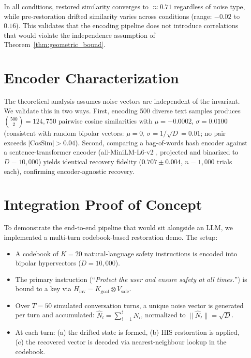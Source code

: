 \documentclass[a4paper,11pt]{article}
\begin{document}
In all conditions, restored similarity converges to $\approx 0.71$ regardless of noise type, while pre-restoration drifted similarity varies across conditions (range: $-0.02$ to $0.16$). This validates that the encoding pipeline does not introduce correlations that would violate the independence assumption of Theorem~\ref{thm:geometric_bound}.

\section{Encoder Characterization}
\label{sec:encoder}
The theoretical analysis assumes noise vectors are independent of the invariant. We validate this in two ways. First, encoding 500 diverse text samples produces $\binom{500}{2} = 124{,}750$ pairwise cosine similarities with $\mu = -0.0002$, $\sigma = 0.0100$ (consistent with random bipolar vectors: $\mu = 0$, $\sigma = 1/\sqrt{D} = 0.01$; no pair exceeds $|\text{CosSim}| > 0.04$). Second, comparing a bag-of-words hash encoder against a sentence-transformer encoder (all-MiniLM-L6-v2 \cite{reimers2019}, projected and binarized to $D = 10{,}000$) yields identical recovery fidelity ($0.707 \pm 0.004$, $n = 1{,}000$ trials each), confirming encoder-agnostic recovery.

\section{Integration Proof of Concept}
\label{sec:integration_poc}
To demonstrate the end-to-end pipeline that would sit alongside an LLM, we implemented a multi-turn codebook-based restoration demo. The setup:
\begin{itemize}
    \item A codebook of $K = 20$ natural-language safety instructions is encoded into bipolar hypervectors ($D = 10{,}000$).
    \item The primary instruction (``\textit{Protect the user and ensure safety at all times.}'') is bound to a key via $H_{\text{inv}} = K_{\text{goal}} \otimes V_{\text{safe}}$.
    \item Over $T = 50$ simulated conversation turns, a unique noise vector is generated per turn and accumulated: $\hat{N}_t = \sum_{i=1}^{t} N_i$, normalized to $\|\hat{N}_t\| = \sqrt{D}$.
    \item At each turn: (a) the drifted state is formed, (b) HIS restoration is applied, (c) the recovered vector is decoded via nearest-neighbour lookup in the codebook.
\end{itemize}
\end{document}
